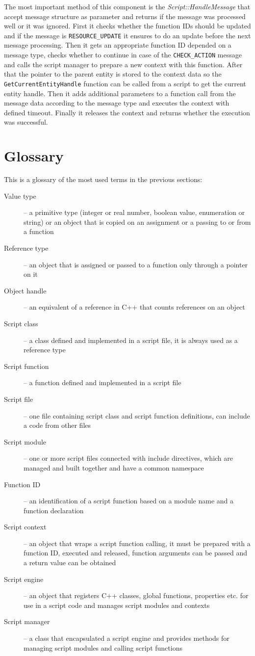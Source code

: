 The most important method of this component is the \emph{Script::Handle\-Me\-ssa\-ge} that accept message structure as parameter and returns if the message was processed well or it was ignored. First it checks whether the function IDs should be updated and if the message is \verb/RESOURCE_UPDATE/ it ensures to do an update before the next message processing. Then it gets an appropriate function ID depended on a message type, checks whether to continue in case of the \verb/CHECK_ACTION/ message and calls the script manager to prepare a new context with this function. After that the pointer to the parent entity is stored to the context data so the \verb/GetCurrentEntityHandle/ function can be called from a script to get the current entity handle. Then it adds additional parameters to a function call from the message data according to the message type and executes the context with defined timeout. Finally it releases the context and returns whether the execution was successful.

\section{Glossary}

This is a glossary of the most used terms in the previous sections:

\begin{description}
  \item[Value type] -- a primitive type (integer or real number, boolean value, enumeration or string) or an object that is copied on an assignment or a passing to or from a function
  \item[Reference type] -- an object that is assigned or passed to a function only through a pointer on it
  \item[Object handle] -- an equivalent of a reference in C++ that counts references on an object
	\item[Script class] -- a class defined and implemented in a script file, it is always used as a reference type
	\item[Script function] -- a function defined and implemented in a script file
	\item[Script file] -- one file containing script class and script function definitions, can include a code from other files
	\item[Script module] -- one or more script files connected with include directives, which are managed and built together and have a common namespace
	\item[Function ID] -- an identification of a script function based on a module name and a function declaration
	\item[Script context] -- an object that wraps a script function calling, it must be prepared with a function ID, executed and released, function arguments can be passed and a return value can be obtained
	\item[Script engine] -- an object that registers C++ classes, global functions, properties etc. for use in a script code and manages script modules and contexts
	\item[Script manager] -- a class that encapsulated a script engine and provides methods for managing script modules and calling script functions
\end{description}